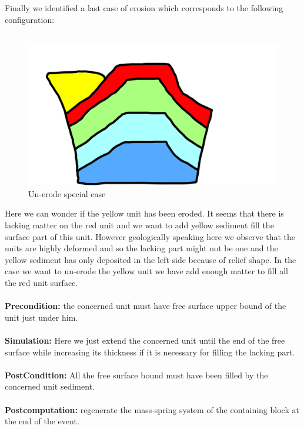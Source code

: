 \documentclass[12pt, a4paper]{report} %
\begin{document}
Finally we identified a last case of erosion which corresponds to the following configuration:\\\\
\begin{figure}[H]
	\centering
	\includegraphics[scale=0.3]{unErodeSpecial.png}
	\caption{Un-erode special case}
\end{figure}
Here we can wonder if the yellow unit has been eroded.  It seems that there is lacking matter on the red unit and we want to add yellow sediment fill the surface part of this unit. However geologically speaking here we observe that the units are highly deformed and so the lacking part might not be one and the yellow sediment has only deposited in the left side because of relief shape. In the case we want to un-erode  the yellow unit we have add enough matter to fill all the red unit surface.\\\\
\textbf{Precondition:} the concerned unit must have free surface upper bound of the unit just under him.\\\\
\textbf{Simulation:} Here we just extend the concerned unit until the end of the free surface while increasing its thickness if it is necessary for filling the lacking part.\\\\
\textbf{PostCondition:} All the free surface bound must have been filled by the concerned unit sediment.\\\\
\textbf{Postcomputation:} regenerate the mass-spring system of the containing block at the end of the event.\\\\
\end{document}
